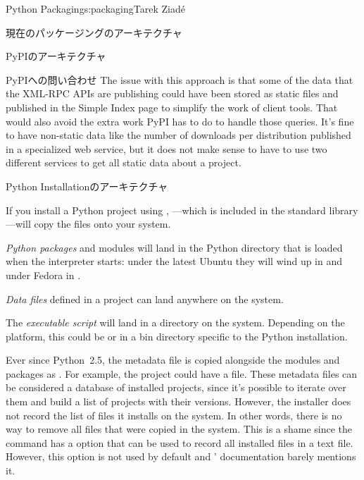 \begin{aosachapter}{Python Packaging}{s:packaging}{Tarek Ziad\'{e}}
\begin{aosasect1}{現在のパッケージングのアーキテクチャ}
\begin{aosasect2}{PyPIのアーキテクチャ}
\begin{aosasect3}{PyPIへの問い合わせ}
\noindent The issue with this approach is that some of the data that the XML-RPC
APIs are publishing could have been stored as static files and
published in the Simple Index page to simplify the work of client
tools.  That would also avoid the extra work PyPI has to do to handle
those queries.  It's fine to have non-static data like the number of
downloads per distribution published in a specialized web service, but
it does not make sense to have to use two different services to get
all static data about a project.

\end{aosasect3}

\end{aosasect2}

\begin{aosasect2}{Python Installationのアーキテクチャ}

If you install a Python project using ,
---which is included in the standard library---will
copy the files onto your system.

\begin{aosaitemize}

  \item \emph{Python packages} and modules will land in the Python
  directory that is loaded when the interpreter starts: under the
  latest Ubuntu they will wind up in
   and under Fedora in
  .

  \item \emph{Data files} defined in a project can land anywhere
  on the system.

  \item The \emph{executable script} will land in a  directory
  on the system. Depending on the platform, this could be
   or in a bin directory specific to the Python
  installation.

\end{aosaitemize}

Ever since Python~2.5, the metadata file is copied alongside the modules
and packages as . For example, the
 project could have a
 file.  These metadata files can be
considered a database of installed projects, since it's possible to
iterate over them and build a list of projects with their versions.
However, the  installer does not record the list of
files it installs on the system.  In other words, there is no way to
remove all files that were copied in the system.  This is a shame
since the  command has a  option that can
be used to record all installed files in a text file. However, this
option is not used by default and ' documentation
barely mentions it.


\end{aosasect2}
\end{aosasect1}
\end{aosachapter}
